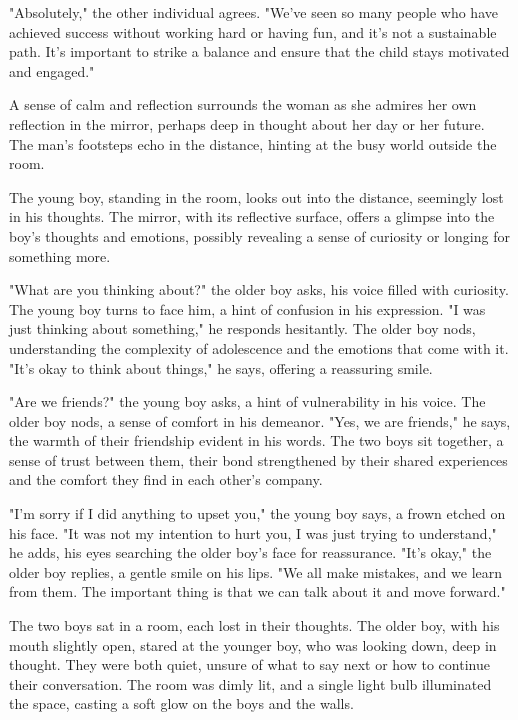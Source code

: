 \documentclass[smalldemyvopaper,11pt,twoside,onecolumn,openright,extrafontsizes]{memoir}
\begin{document}
"Absolutely," the other individual agrees. "We've seen so many people who have achieved success without working hard or having fun, and it's not a sustainable path. It's important to strike a balance and ensure that the child stays motivated and engaged."\par
A sense of calm and reflection surrounds the woman as she admires her own reflection in the mirror, perhaps deep in thought about her day or her future. The man's footsteps echo in the distance, hinting at the busy world outside the room.\par
The young boy, standing in the room, looks out into the distance, seemingly lost in his thoughts. The mirror, with its reflective surface, offers a glimpse into the boy's thoughts and emotions, possibly revealing a sense of curiosity or longing for something more.\par
"What are you thinking about?" the older boy asks, his voice filled with curiosity. The young boy turns to face him, a hint of confusion in his expression. "I was just thinking about something," he responds hesitantly. The older boy nods, understanding the complexity of adolescence and the emotions that come with it. "It's okay to think about things," he says, offering a reassuring smile.\par
"Are we friends?" the young boy asks, a hint of vulnerability in his voice. The older boy nods, a sense of comfort in his demeanor. "Yes, we are friends," he says, the warmth of their friendship evident in his words. The two boys sit together, a sense of trust between them, their bond strengthened by their shared experiences and the comfort they find in each other's company.\par
"I'm sorry if I did anything to upset you," the young boy says, a frown etched on his face. "It was not my intention to hurt you, I was just trying to understand," he adds, his eyes searching the older boy's face for reassurance. "It's okay," the older boy replies, a gentle smile on his lips. "We all make mistakes, and we learn from them. The important thing is that we can talk about it and move forward."\par
The two boys sat in a room, each lost in their thoughts. The older boy, with his mouth slightly open, stared at the younger boy, who was looking down, deep in thought. They were both quiet, unsure of what to say next or how to continue their conversation. The room was dimly lit, and a single light bulb illuminated the space, casting a soft glow on the boys and the walls.\par
\end{document}
